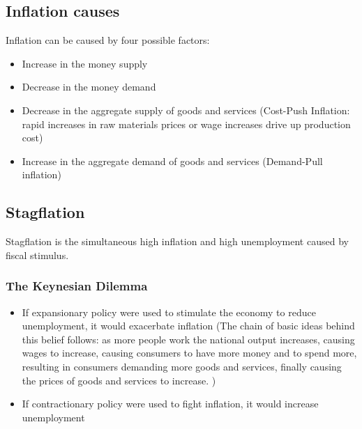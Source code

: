 \documentclass[a4paper,13pt]{report}
\begin{document}
\subsection{Inflation causes}
Inflation can be caused by four possible factors:
\begin{itemize}
    \item Increase in the money supply
    \item Decrease in the money demand
    \item Decrease in the aggregate supply of goods and services (Cost-Push Inflation: rapid increases in raw materials prices or wage increases drive up production cost)
    \item Increase in the aggregate demand of goods and services (Demand-Pull inflation)
\end{itemize}


\subsection{Stagflation}
Stagflation is the simultaneous high inflation and high unemployment caused by fiscal stimulus.
\subsubsection{The Keynesian Dilemma}
\begin{itemize}
    \item If expansionary policy were used to stimulate the economy to reduce unemployment, it would exacerbate inflation (The chain of basic ideas behind this belief follows: as more people work the national output increases, causing wages to increase, causing consumers to have more money and to spend more, resulting in consumers demanding more goods and services, finally causing the prices of goods and services to increase. )
    \item If contractionary policy were used to fight inflation, it would increase unemployment
\end{itemize}
\end{document}
